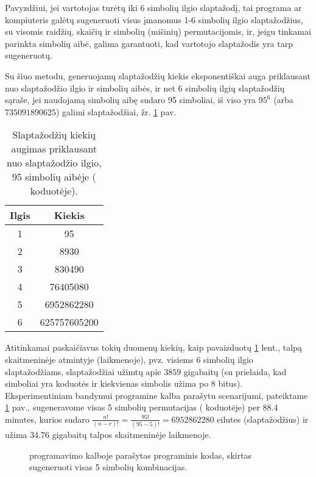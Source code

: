 \documentclass{VUMIFInfBakalaurinis}
\begin{document}
Pavyzdžiui, jei vartotojas turėtų iki 6 simbolių ilgio slaptažodį, tai programa 
ar kompiuteris galėtų sugeneruoti visus įmanomus 1-6 simbolių ilgio 
slaptažodžius, su visomis raidžių, skaičių ir simbolių (mišinių) permutacijomis, 
ir, jeigu tinkamai parinkta simbolių aibė, galima garantuoti, kad vartotojo 
slaptažodis yra tarp sugeneruotų.

Su šiuo metodu, generuojamų slaptažodžių kiekis eksponentiškai auga priklausant 
nuo slaptažodžio ilgio ir simbolių aibės, ir net 6 simbolių ilgių slaptažodžių 
sąraše, jei naudojamą simbolių aibę sudaro 95 simboliai, iš viso yra $95^6$ 
(arba $735091890625$) galimi slaptažodžiai, žr. \ref{tab:bruteforce} pav.

\begin{table}[hb]
  \centering
  \caption{%
    Slaptažodžių kiekių augimas priklausant nuo slaptažodžio ilgio, 95 simbolių 
    aibėje ( koduotėje).
  }
  \begin{tabular}{|c|c|}
    \hline \textbf{Ilgis} & \textbf{Kiekis} \\
    \hline 1 & 95 \\
    \hline 2 & 8930 \\
    \hline 3 & 830490 \\
    \hline 4 & 76405080 \\
    \hline 5 & 6952862280 \\
    \hline 6 & 625757605200 \\
    \hline
  \end{tabular}
  \label{tab:bruteforce}
\end{table}

Atitinkamai paskaičiavus tokių duomenų kiekių, kaip pavaizduotų 
\ref{tab:bruteforce} lent., talpą skaitmeninėje atmintyje (laikmenoje), pvz. 
visiems 6 simbolių ilgio slaptažodžiams, slaptažodžiai užimtų apie $3859$ 
gigabaitų (su prielaida, kad simboliai yra  koduotės ir 
kiekvienas simbolis užima po 8 bitus). Eksperimentiniam bandymui 
 programine kalba parašytu scenarijumi, pateiktame 
\ref{fig:permutacijos} pav., sugeneravome visas 5 simbolių permutacijas 
( koduotėje) per $88.4$ minutes, kurios sudaro 
$\frac{n!}{(n-r)!}=\frac{95!}{(95 - 5)!}=6952862280$ eilutes (slaptažodžius) ir 
užima $34.76$ gigabaitų talpos skaitmeninėje laikmenoje.

\begin{figure}
  \begin{center}
    
    \caption{%
       programavimo kalboje parašytas programinis kodas, 
      skirtas sugeneruoti visas 5 simbolių kombinacijas.
    }
    \label{fig:permutacijos}
  \end{center}
\end{figure}
\end{document}
